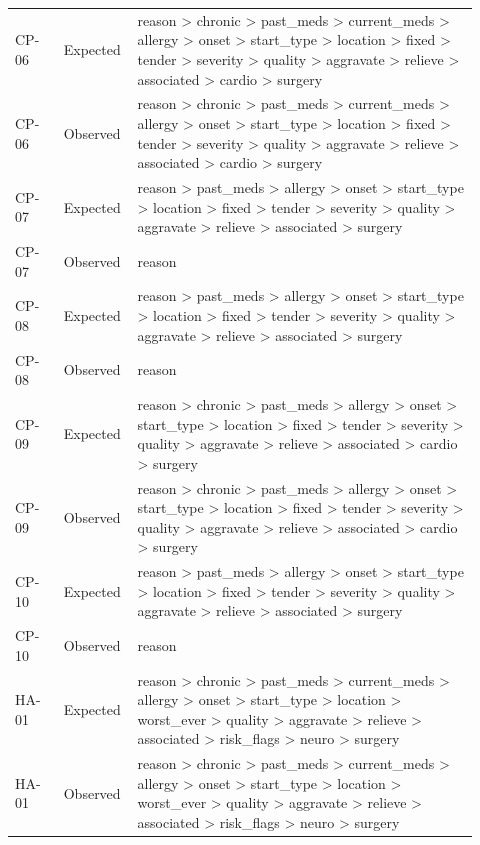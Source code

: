 \begin{longtable}{>{\raggedright\arraybackslash}p{0.1\linewidth}>{\raggedright\arraybackslash}p{0.12\linewidth}>{\raggedright\arraybackslash}p{0.7\linewidth}}
CP-\allowbreak{}06 & Expected & reason > chronic > past\_\allowbreak{}meds > current\_\allowbreak{}meds > allergy > onset > start\_\allowbreak{}type > location > fixed > tender > severity > quality > aggravate > relieve > associated > cardio > surgery \\
CP-\allowbreak{}06 & Observed & reason > chronic > past\_\allowbreak{}meds > current\_\allowbreak{}meds > allergy > onset > start\_\allowbreak{}type > location > fixed > tender > severity > quality > aggravate > relieve > associated > cardio > surgery \\
CP-\allowbreak{}07 & Expected & reason > past\_\allowbreak{}meds > allergy > onset > start\_\allowbreak{}type > location > fixed > tender > severity > quality > aggravate > relieve > associated > surgery \\
CP-\allowbreak{}07 & Observed & reason \\
CP-\allowbreak{}08 & Expected & reason > past\_\allowbreak{}meds > allergy > onset > start\_\allowbreak{}type > location > fixed > tender > severity > quality > aggravate > relieve > associated > surgery \\
CP-\allowbreak{}08 & Observed & reason \\
CP-\allowbreak{}09 & Expected & reason > chronic > past\_\allowbreak{}meds > allergy > onset > start\_\allowbreak{}type > location > fixed > tender > severity > quality > aggravate > relieve > associated > cardio > surgery \\
CP-\allowbreak{}09 & Observed & reason > chronic > past\_\allowbreak{}meds > allergy > onset > start\_\allowbreak{}type > location > fixed > tender > severity > quality > aggravate > relieve > associated > cardio > surgery \\
CP-\allowbreak{}10 & Expected & reason > past\_\allowbreak{}meds > allergy > onset > start\_\allowbreak{}type > location > fixed > tender > severity > quality > aggravate > relieve > associated > surgery \\
CP-\allowbreak{}10 & Observed & reason \\
HA-\allowbreak{}01 & Expected & reason > chronic > past\_\allowbreak{}meds > current\_\allowbreak{}meds > allergy > onset > start\_\allowbreak{}type > location > worst\_\allowbreak{}ever > quality > aggravate > relieve > associated > risk\_\allowbreak{}flags > neuro > surgery \\
HA-\allowbreak{}01 & Observed & reason > chronic > past\_\allowbreak{}meds > current\_\allowbreak{}meds > allergy > onset > start\_\allowbreak{}type > location > worst\_\allowbreak{}ever > quality > aggravate > relieve > associated > risk\_\allowbreak{}flags > neuro > surgery \\

\end{longtable}
